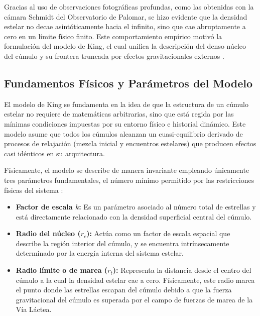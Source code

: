         Gracias al uso de observaciones fotográficas profundas, como las 
        obtenidas con la cámara Schmidt del Observatorio de Palomar, se hizo 
        evidente que la densidad estelar no decae asintóticamente hacia el 
        infinito, sino que cae abruptamente a cero en un límite físico finito. 
        Este comportamiento empírico motivó la formulación del modelo de King, 
        el cual unifica la descripción del denso núcleo del cúmulo y su frontera 
        truncada por efectos gravitacionales externos \cite{king1962structure}.

    \subsection{Fundamentos Físicos y Parámetros del Modelo}
        El modelo de King se fundamenta en la idea de que la estructura de un 
        cúmulo estelar no requiere de matemáticas arbitrarias, sino que está 
        regida por las mínimas condiciones impuestas por su entorno físico e 
        historial dinámico. Este modelo asume que todos los cúmulos alcanzan un 
        cuasi-equilibrio derivado de procesos de relajación (mezcla inicial y 
        encuentros estelares) que producen efectos casi idénticos en su 
        arquitectura.

        Físicamente, el modelo se describe de manera invariante empleando 
        únicamente tres parámetros fundamentales, el número mínimo permitido por 
        las restricciones físicas del sistema \cite{king1962structure}:

        \begin{itemize}
            \item \textbf{Factor de escala $k$:} Es un parámetro asociado al 
            número total de estrellas y está directamente relacionado con la 
            densidad superficial central del cúmulo.
            
            \item \textbf{Radio del núcleo ($r_c$):} Actúa como un factor de 
            escala espacial que describe la región interior del cúmulo, y se 
            encuentra intrínsecamente determinado por la energía interna del 
            sistema estelar.

            \item \textbf{Radio límite o de marea ($r_t$):} Representa la 
            distancia desde el centro del cúmulo a la cual la densidad estelar 
            cae a cero. Físicamente, este radio marca el punto donde las 
            estrellas escapan del cúmulo debido a que la fuerza gravitacional 
            del cúmulo es superada por el campo de fuerzas de marea de la Vía 
            Láctea.
        \end{itemize}

